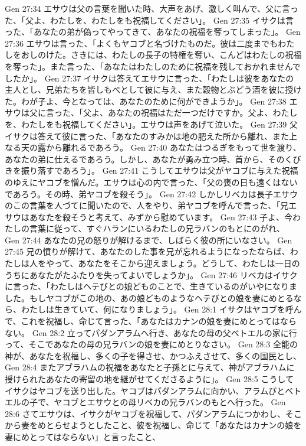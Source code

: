Gen 27:34  エサウは父の言葉を聞いた時、大声をあげ、激しく叫んで、父に言った、「父よ、わたしを、わたしをも祝福してください」。
Gen 27:35  イサクは言った、「あなたの弟が偽ってやってきて、あなたの祝福を奪ってしまった」。
Gen 27:36  エサウは言った、「よくもヤコブと名づけたものだ。彼は二度までもわたしをおしのけた。さきには、わたしの長子の特権を奪い、こんどはわたしの祝福を奪った」。また言った、「あなたはわたしのために祝福を残しておかれませんでしたか」。
Gen 27:37  イサクは答えてエサウに言った、「わたしは彼をあなたの主人とし、兄弟たちを皆しもべとして彼に与え、また穀物とぶどう酒を彼に授けた。わが子よ、今となっては、あなたのために何ができようか」。
Gen 27:38  エサウは父に言った、「父よ、あなたの祝福はただ一つだけですか。父よ、わたしを、わたしをも祝福してください」。エサウは声をあげて泣いた。
Gen 27:39  父イサクは答えて彼に言った、「あなたのすみかは地の肥えた所から離れ、また上なる天の露から離れるであろう。
Gen 27:40  あなたはつるぎをもって世を渡り、あなたの弟に仕えるであろう。しかし、あなたが勇み立つ時、首から、そのくびきを振り落すであろう」。
Gen 27:41  こうしてエサウは父がヤコブに与えた祝福のゆえにヤコブを憎んだ。エサウは心の内で言った、「父の喪の日も遠くはないであろう。その時、弟ヤコブを殺そう」。
Gen 27:42  しかしリベカは長子エサウのこの言葉を人づてに聞いたので、人をやり、弟ヤコブを呼んで言った、「兄エサウはあなたを殺そうと考えて、みずから慰めています。
Gen 27:43  子よ、今わたしの言葉に従って、すぐハランにいるわたしの兄ラバンのもとにのがれ、
Gen 27:44  あなたの兄の怒りが解けるまで、しばらく彼の所にいなさい。
Gen 27:45  兄の憤りが解けて、あなたのした事を兄が忘れるようになったならば、わたしは人をやって、あなたをそこから迎えましょう。どうして、わたしは一日のうちにあなたがたふたりを失ってよいでしょうか」。
Gen 27:46  リベカはイサクに言った、「わたしはヘテびとの娘どものことで、生きているのがいやになりました。もしヤコブがこの地の、あの娘どものようなヘテびとの娘を妻にめとるなら、わたしは生きていて、何になりましょう」。
Gen 28:1  イサクはヤコブを呼んで、これを祝福し、命じて言った、「あなたはカナンの娘を妻にめとってはならない。
Gen 28:2  立ってパダンアラムへ行き、あなたの母の父ベトエルの家に行って、そこであなたの母の兄ラバンの娘を妻にめとりなさい。
Gen 28:3  全能の神が、あなたを祝福し、多くの子を得させ、かつふえさせて、多くの国民とし、
Gen 28:4  またアブラハムの祝福をあなたと子孫とに与えて、神がアブラハムに授けられたあなたの寄留の地を継がせてくださるように」。
Gen 28:5  こうしてイサクはヤコブを送り出した。ヤコブはパダンアラムに向かい、アラムびとベトエルの子で、ヤコブとエサウとの母リベカの兄ラバンのもとへ行った。
Gen 28:6  さてエサウは、イサクがヤコブを祝福して、パダンアラムにつかわし、そこから妻をめとらせようとしたこと、彼を祝福し、命じて「あなたはカナンの娘を妻にめとってはならない」と言ったこと、
